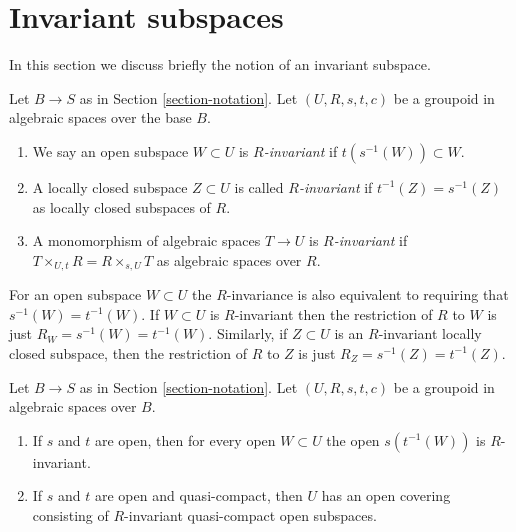 \section{Invariant subspaces}
\label{section-invariant}

\noindent
In this section we discuss briefly the notion of an invariant subspace.

\begin{definition}
\label{definition-invariant-open}
Let $B \to S$ as in Section \ref{section-notation}.
Let $(U, R, s, t, c)$ be a groupoid in algebraic spaces over the base $B$.
\begin{enumerate}
\item We say an open subspace $W \subset U$ is {\it $R$-invariant} if
$t(s^{-1}(W)) \subset W$.
\item A locally closed subspace $Z \subset U$ is called {\it $R$-invariant}
if $t^{-1}(Z) = s^{-1}(Z)$ as locally closed subspaces of $R$.
\item A monomorphism of algebraic spaces $T \to U$ is {\it $R$-invariant}
if $T \times_{U, t} R = R \times_{s, U} T$ as algebraic spaces over $R$.
\end{enumerate}
\end{definition}

\noindent
For an open subspace $W \subset U$ the $R$-invariance
is also equivalent to requiring that $s^{-1}(W) = t^{-1}(W)$.
If $W \subset U$ is $R$-invariant then the restriction of $R$ to
$W$ is just $R_W = s^{-1}(W) = t^{-1}(W)$. Similarly, if $Z \subset U$
is an $R$-invariant locally closed subspace, then the restriction of $R$
to $Z$ is just $R_Z = s^{-1}(Z) = t^{-1}(Z)$.

\begin{lemma}
\label{lemma-constructing-invariant-opens}
Let $B \to S$ as in Section \ref{section-notation}.
Let $(U, R, s, t, c)$ be a groupoid in algebraic spaces over $B$.
\begin{enumerate}
\item If $s$ and $t$ are open, then for every open $W \subset U$
the open $s(t^{-1}(W))$ is $R$-invariant.
\item If $s$ and $t$ are open and quasi-compact, then $U$ has an open
covering consisting of $R$-invariant quasi-compact open subspaces.
\end{enumerate}
\end{lemma}


